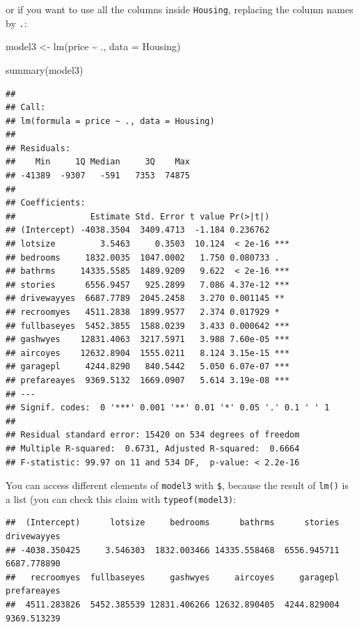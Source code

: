 \documentclass[
]{article}
\newenvironment{Shaded}{\begin{snugshade}}{\end{snugshade}}
\newcommand{\AttributeTok}[1]{\textcolor[rgb]{0.77,0.63,0.00}{#1}}
\newcommand{\FunctionTok}[1]{\textcolor[rgb]{0.00,0.00,0.00}{#1}}
\newcommand{\NormalTok}[1]{#1}
\newcommand{\OtherTok}[1]{\textcolor[rgb]{0.56,0.35,0.01}{#1}}
\newcommand{\SpecialCharTok}[1]{\textcolor[rgb]{0.00,0.00,0.00}{#1}}
\begin{document}
or if you want to use all the columns inside \texttt{Housing}, replacing the column names by \texttt{.}:

\begin{Shaded}
\begin{Highlighting}[]
\NormalTok{model3 }\OtherTok{\textless{}{-}} \FunctionTok{lm}\NormalTok{(price }\SpecialCharTok{\textasciitilde{}}\NormalTok{ ., }\AttributeTok{data =}\NormalTok{ Housing)}

\FunctionTok{summary}\NormalTok{(model3)}
\end{Highlighting}
\end{Shaded}

\begin{verbatim}
## 
## Call:
## lm(formula = price ~ ., data = Housing)
## 
## Residuals:
##    Min     1Q Median     3Q    Max 
## -41389  -9307   -591   7353  74875 
## 
## Coefficients:
##               Estimate Std. Error t value Pr(>|t|)    
## (Intercept) -4038.3504  3409.4713  -1.184 0.236762    
## lotsize         3.5463     0.3503  10.124  < 2e-16 ***
## bedrooms     1832.0035  1047.0002   1.750 0.080733 .  
## bathrms     14335.5585  1489.9209   9.622  < 2e-16 ***
## stories      6556.9457   925.2899   7.086 4.37e-12 ***
## drivewayyes  6687.7789  2045.2458   3.270 0.001145 ** 
## recroomyes   4511.2838  1899.9577   2.374 0.017929 *  
## fullbaseyes  5452.3855  1588.0239   3.433 0.000642 ***
## gashwyes    12831.4063  3217.5971   3.988 7.60e-05 ***
## aircoyes    12632.8904  1555.0211   8.124 3.15e-15 ***
## garagepl     4244.8290   840.5442   5.050 6.07e-07 ***
## prefareayes  9369.5132  1669.0907   5.614 3.19e-08 ***
## ---
## Signif. codes:  0 '***' 0.001 '**' 0.01 '*' 0.05 '.' 0.1 ' ' 1
## 
## Residual standard error: 15420 on 534 degrees of freedom
## Multiple R-squared:  0.6731, Adjusted R-squared:  0.6664 
## F-statistic: 99.97 on 11 and 534 DF,  p-value: < 2.2e-16
\end{verbatim}

You can access different elements of \texttt{model3} with \texttt{\$}, because the result of \texttt{lm()} is a list
(you can check this claim with \texttt{typeof(model3)}:

\begin{Shaded}
\end{Shaded}

\begin{verbatim}
##  (Intercept)      lotsize     bedrooms      bathrms      stories  drivewayyes 
## -4038.350425     3.546303  1832.003466 14335.558468  6556.945711  6687.778890 
##   recroomyes  fullbaseyes     gashwyes     aircoyes     garagepl  prefareayes 
##  4511.283826  5452.385539 12831.406266 12632.890405  4244.829004  9369.513239
\end{verbatim}
\end{document}
